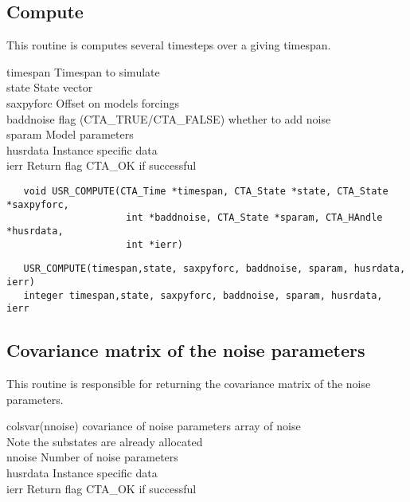 \subsection{Compute}
This routine is computes several timesteps over a giving timespan.

\horzline
\begin{tabbing}
\functab
{}
     {timespan}  {Timespan to simulate}\\
 {state}     {State vector}\\
     {saxpyforc} {Offset on models forcings}\\
     {baddnoise} {flag (CTA\_TRUE/CTA\_FALSE) whether to add noise}\\
     {sparam}    {Model parameters}\\
 {husrdata}  {Instance specific data}\\
    {ierr}      {Return flag CTA\_OK if successful}\\
\end{tabbing}
\horzline

\begin{verbatim}
   void USR_COMPUTE(CTA_Time *timespan, CTA_State *state, CTA_State *saxpyforc,
                     int *baddnoise, CTA_State *sparam, CTA_HAndle *husrdata,
                     int *ierr)
\end{verbatim}

\begin{verbatim}
   USR_COMPUTE(timespan,state, saxpyforc, baddnoise, sparam, husrdata, ierr)
   integer timespan,state, saxpyforc, baddnoise, sparam, husrdata, ierr
\end{verbatim}

\subsection{Covariance matrix of the noise parameters}
This routine is responsible for returning the covariance matrix of the noise parameters.

\horzline
\begin{tabbing}
\functab
{}
 {colsvar(nnoise)}   {covariance of noise parameters array of noise}\\
\funcline{}    {}                  {Note the substates are already allocated}\\
     {nnoise}    {Number of noise parameters}\\
 {husrdata}  {Instance specific data}\\
    {ierr}      {Return flag CTA\_OK if successful}\\
\end{tabbing}
\horzline

